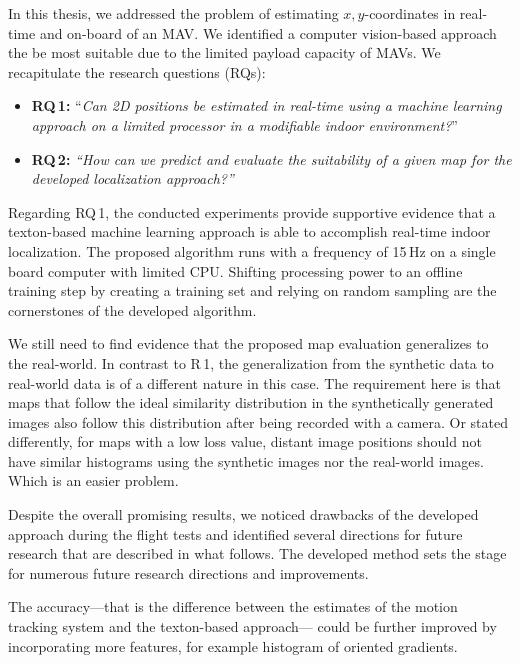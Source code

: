 \documentclass[11pt]{report}
\begin{document}
In this thesis, we addressed the problem of estimating
$x,y$-coordinates in real-time and on-board of an MAV. We identified a
computer vision-based approach the be most suitable due to the limited
payload capacity of MAVs. We recapitulate the research questions
(RQs):

\begin{itemize}
\item \textbf{RQ\,1:} ``\emph{Can 2D positions be estimated in real-time using a
    machine learning approach on a limited processor in a modifiable
    indoor environment?}''
\item \textbf{RQ\,2:} \emph{``How can we predict and evaluate the suitability of a
    given map for the developed localization approach?''} 
\end{itemize}

Regarding RQ\,1, the conducted experiments provide supportive evidence
that a texton-based machine learning approach is able to accomplish
real-time indoor localization. The proposed algorithm runs with a
frequency of 15\,Hz on a single board computer with limited
CPU. Shifting processing power to an offline training step by creating
a training set and relying on random sampling are the cornerstones of
the developed algorithm.



We still need to find evidence that the proposed map evaluation
generalizes to the real-world. In contrast to R\,1, the generalization
from the synthetic data to real-world data is of a different nature in
this case. The requirement here is that maps that follow the ideal
similarity distribution in the synthetically generated images also
follow this distribution after being recorded with a camera. Or stated
differently, for maps with a low loss value, distant image positions
should not have similar histograms using the synthetic images nor the
real-world images. Which is an easier problem.

Despite the overall promising results, we noticed drawbacks of the
developed approach during the flight tests and identified several
directions for future research that are described in what follows. The
developed method sets the stage for numerous future research
directions and improvements.

The accuracy---that is the difference between the estimates of the
motion tracking system and the texton-based approach--- could be
further improved by incorporating more features, for example histogram
of oriented gradients.
\end{document}
